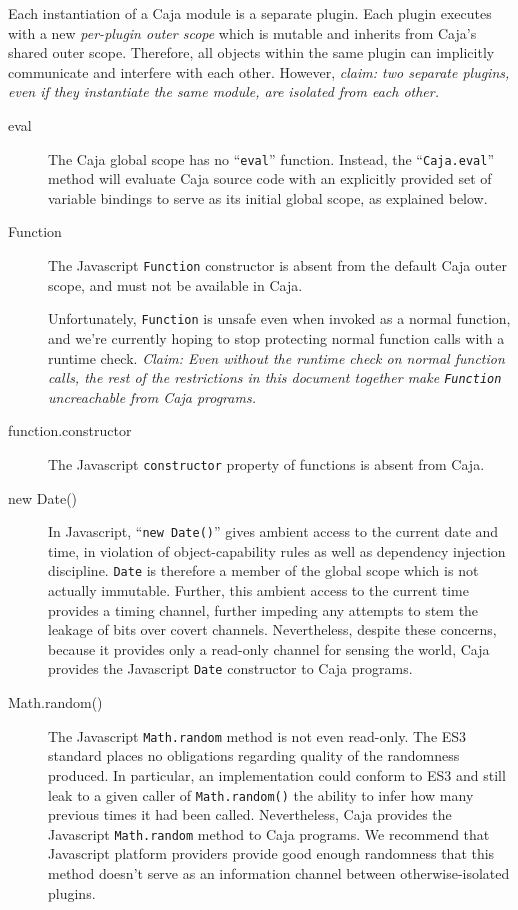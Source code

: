 \documentclass[letterpaper,twocolumn,10pt]{article}
\newcommand{\code}[1]{{\tt {#1}}}              %
\begin{document}
Each instantiation of a Caja module is a separate plugin. Each plugin 
executes with a new \emph{per-plugin outer scope} which is mutable and 
inherits from Caja's shared outer scope. Therefore, all objects within the 
same plugin can implicitly communicate and interfere with each other. 
However, \emph{claim: two separate plugins, even if they instantiate the same 
module, are isolated from each other.}

\begin{description}

    \item[eval] The Caja global scope has no ``\code{eval}'' function. 
    Instead, the ``\code{Caja.eval}'' method will evaluate Caja source code 
    with an explicitly provided set of variable bindings to serve as its 
    initial global scope, as explained below.
    
    \item[Function] The Javascript \code{Function} constructor is absent from 
    the default Caja outer scope, and must not be available in Caja. 

    Unfortunately, \code{Function} is unsafe even when invoked as a normal 
    function, and we're currently hoping to stop protecting normal function 
    calls with a runtime check. \emph{Claim: Even without the runtime check 
    on normal function calls, the rest of the restrictions in this document 
    together make \code{Function} uncreachable from Caja programs.}
    
    \item[function.constructor] The Javascript \code{constructor} property of 
    functions is absent from Caja.

    \item[new Date()] In Javascript, ``\code{new Date()}''  gives ambient 
    access to the current date and time, in violation of object-capability 
    rules as well as dependency injection discipline. \code{Date} is 
    therefore a member of the global scope which is not actually immutable. 
    Further, this ambient access to the current time provides a timing 
    channel, further impeding any attempts to stem the leakage of bits over 
    covert channels. Nevertheless, despite these concerns, because it 
    provides only a read-only channel for sensing the world, Caja provides 
    the Javascript \code{Date} constructor to Caja programs.

    \item[Math.random()] The Javascript \code{Math.random} method is not even 
    read-only. The ES3 standard places no obligations regarding quality of the
    randomness produced. In particular, an implementation could conform to ES3
    and still leak to a given caller of \code{Math.random()} the ability to
    infer how many previous times it had been called. Nevertheless, Caja
    provides the Javascript \code{Math.random} method to Caja programs. We
    recommend that Javascript platform providers provide good enough
    randomness that this method doesn't serve as an information channel
    between otherwise-isolated plugins.
    
\end{description}
\end{document}
